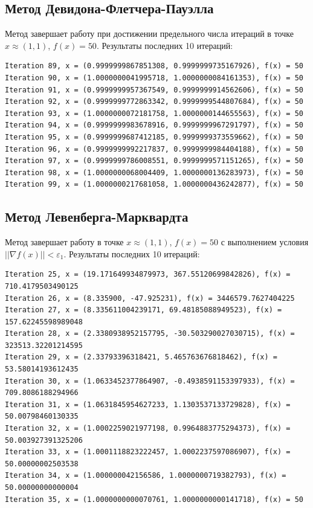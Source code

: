 \documentclass[a4paper, 14pt]{extarticle}
\begin{document}
\subsection{Метод Девидона-Флетчера-Пауэлла}

Метод завершает работу при достижении предельного числа итераций в точке $x \approx (1, 1)$, $f(x) = 50$.
Результаты последних 10 итераций:
\begin{small}
\begin{Verbatim}
Iteration 89, x = (0.9999999867851308, 0.9999999735167926), f(x) = 50
Iteration 90, x = (1.0000000041995718, 1.0000000084161353), f(x) = 50
Iteration 91, x = (0.9999999957367549, 0.9999999914562606), f(x) = 50
Iteration 92, x = (0.9999999772863342, 0.9999999544807684), f(x) = 50
Iteration 93, x = (1.0000000072181758, 1.0000000144655563), f(x) = 50
Iteration 94, x = (0.9999999983678916, 0.9999999967291797), f(x) = 50
Iteration 95, x = (0.9999999687412185, 0.9999999373559662), f(x) = 50
Iteration 96, x = (0.9999999992217837, 0.9999999984404188), f(x) = 50
Iteration 97, x = (0.9999999786008551, 0.9999999571151265), f(x) = 50
Iteration 98, x = (1.0000000068004409, 1.0000000136283973), f(x) = 50
Iteration 99, x = (1.0000000217681058, 1.0000000436242877), f(x) = 50
\end{Verbatim}
\end{small}

\subsection{Метод Левенберга-Марквардта}

Метод завершает работу в точке $x \approx (1, 1)$, $f(x) = 50$ с выполнением условия $||\nabla f(x)|| < \varepsilon_1$.
Результаты последних 10 итераций:
\begin{small}
\begin{Verbatim}
Iteration 25, x = (19.171649934879973, 367.55120699842826), f(x) = 710.4179503490125
Iteration 26, x = (8.335900, -47.925231), f(x) = 3446579.7627404225
Iteration 27, x = (8.335611004239171, 69.48185088949523), f(x) = 157.62245598989048
Iteration 28, x = (2.3380938952157795, -30.503290027030715), f(x) = 323513.32201214595
Iteration 29, x = (2.33793396318421, 5.465763676818462), f(x) = 53.58014193612435
Iteration 30, x = (1.0633452377864907, -0.4938591153397933), f(x) = 709.8086188294966
Iteration 31, x = (1.0631845954627233, 1.1303537133729828), f(x) = 50.00798460130335
Iteration 32, x = (1.0002259021977198, 0.9964883775294373), f(x) = 50.003927391325206
Iteration 33, x = (1.0001118823222457, 1.0002237597086907), f(x) = 50.00000002503538
Iteration 34, x = (1.000000042156586, 1.0000000719382793), f(x) = 50.00000000000004
Iteration 35, x = (1.0000000000070761, 1.0000000000141718), f(x) = 50
\end{Verbatim}
\end{small}
\end{document}
